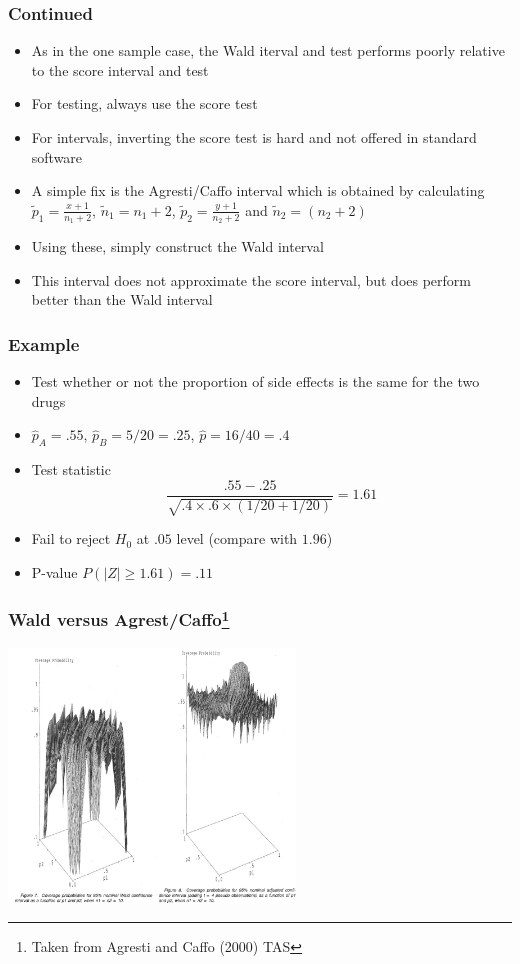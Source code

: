\documentclass[aspectratio=169]{beamer}
\begin{document}
\begin{frame}\frametitle{Continued}
  \begin{itemize}
  \item As in the one sample case, the Wald iterval and test performs poorly
    relative to the score interval and test
  \item For testing, always use the score test
  \item For intervals, inverting the score test is hard and not offered in standard software
  \item A simple fix is the Agresti/Caffo interval which is obtained by calculating $\tilde p_1 = \frac{x + 1}{n_1 + 2}$, $\tilde n_1 = n_1 + 2$, $\tilde p_2 = \frac{y + 1}{n_2 + 2}$ and $\tilde n_2 = (n_2 + 2)$
  \item Using these, simply construct the Wald interval  
  \item This interval does not approximate the score interval, but does
    perform better than the Wald interval
  \end{itemize}
\end{frame}
 

\begin{frame}\frametitle{Example} 
  \begin{itemize}
  \item Test whether or not the proportion of side effects is the same
    for the two drugs
  \item $\hat p_A = .55$, $\hat p_B = 5 / 20 = .25$, $\hat p = 16 / 40 = .4$
  \item Test statistic
    $$
    \frac{.55 - .25}{\sqrt{.4 \times .6 \times (1 / 20 + 1 / 20)}} = 1.61
    $$
  \item Fail to reject $H_0$ at $.05$ level (compare with $1.96$)
  \item P-value $P(|Z| \geq 1.61) = .11$
  \end{itemize}
\end{frame}

\begin{frame}\frametitle{Wald versus Agrest/Caffo\footnote{Taken from Agresti and Caffo (2000) TAS }}
\begin{center}
\includegraphics[width=3in]{waldTwoSample2.pdf}
\end{center}
\end{frame}
\end{document}
